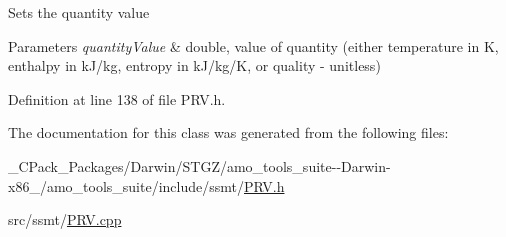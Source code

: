 Sets the quantity value


\begin{DoxyParams}{Parameters}
{\em quantity\+Value} & double, value of quantity (either temperature in K, enthalpy in k\+J/kg, entropy in k\+J/kg/K, or quality -\/ unitless) \\
\hline
\end{DoxyParams}


Definition at line 138 of file P\+R\+V.\+h.



The documentation for this class was generated from the following files\+:\begin{DoxyCompactItemize}
\item 
\+\_\+\+C\+Pack\+\_\+\+Packages/\+Darwin/\+S\+T\+G\+Z/amo\+\_\+tools\+\_\+suite-\/-\/\+Darwin-\/x86\+\_/amo\+\_\+tools\+\_\+suite/include/ssmt/\hyperlink{___c_pack___packages_2_darwin_2_s_t_g_z_2amo__tools__suite--_darwin-x86__64_2amo__tools__suite_2include_2ssmt_2_p_r_v_8h}{P\+R\+V.\+h}\item 
src/ssmt/\hyperlink{_p_r_v_8cpp}{P\+R\+V.\+cpp}\end{DoxyCompactItemize}
